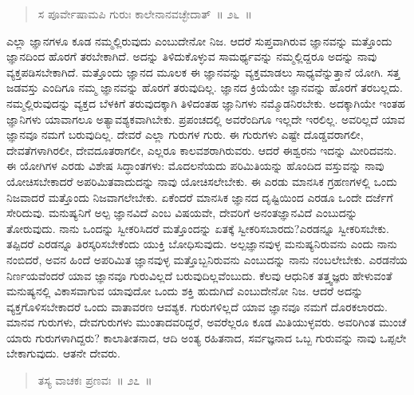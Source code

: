 \vspace{-0.2cm}

\begin{verse}
ಸ ಪೂರ್ವೇಷಾಮಪಿ ಗುರುಃ ಕಾಲೇನಾನವಚ್ಛೇದಾತ್​~॥ ೨೬~॥
\end{verse}

\vspace{-0.45cm}


\vspace{0.2cm}

ಎಲ್ಲಾ ಜ್ಞಾನಗಳೂ ಕೂಡ ನಮ್ಮಲ್ಲಿರುವುದು ಎಂಬುದೇನೋ ನಿಜ. ಆದರೆ ಸುಪ್ತವಾಗಿರುವ ಜ್ಞಾನವನ್ನು ಮತ್ತೊಂದು ಜ್ಞಾನದಿಂದ ಹೊರಗೆ ತರಬೇಕಾಗಿದೆ. ಅದನ್ನು ತಿಳಿದುಕೊಳ್ಳುವ ಸಾಮರ್ಥ್ಯವನ್ನು ನಮ್ಮಲ್ಲಿದ್ದರೂ ಅದನ್ನು ನಾವು ವ್ಯಕ್ತಪಡಿಸಬೇಕಾಗಿದೆ. ಮತ್ತೊಂದು ಜ್ಞಾನದ ಮೂಲಕ ಈ ಜ್ಞಾನವನ್ನು ವ್ಯಕ್ತಮಾಡಲು ಸಾಧ್ಯವೆನ್ನುತ್ತಾನೆ ಯೋಗಿ. ಸತ್ತ ಜಡವಸ್ತು ಎಂದಿಗೂ ನಮ್ಮ ಜ್ಞಾನವನ್ನು ಹೊರಗೆ ತರುವುದಿಲ್ಲ. ಜ್ಞಾನದ ಕ್ರಿಯೆಯೇ ಜ್ಞಾನವನ್ನು ಹೊರಗೆ ತರಬಲ್ಲದು. ನಮ್ಮಲ್ಲಿರುವುದನ್ನು ವ್ಯಕ್ತದ ಬೆಳಕಿಗೆ ತರುವುದಕ್ಕಾಗಿ ತಿಳಿದಂತಹ ಜ್ಞಾನಿಗಳು ನಮ್ಮೊಡನಿರಬೇಕು. ಅದಕ್ಕಾಗಿಯೇ ಇಂತಹ ಜ್ಞಾನಿಗಳು ಯಾವಾಗಲೂ ಅತ್ಯಾವಶ್ಯಕವಾಗಿಬೇಕು. ಪ್ರಪಂಚದಲ್ಲಿ ಅವರೆಂದಿಗೂ ಇಲ್ಲದೇ ಇರಲಿಲ್ಲ. ಅವರಿಲ್ಲದೆ ಯಾವ ಜ್ಞಾನವೂ ನಮಗೆ ಬರುವುದಿಲ್ಲ. ದೇವರೆ ಎಲ್ಲಾ ಗುರುಗಳ ಗುರು. ಈ ಗುರುಗಳು ಎಷ್ಟೇ ದೊಡ್ಡವರಾಗಲೀ, ದೇವತೆಗಳಾಗಿರಲೀ, ದೇವದೂತರಾಗಲೀ, ಎಲ್ಲರೂ ಕಾಲವಶರಾಗಿರುವರು. ಆದರೆ ಈಶ್ವರನು ಇದನ್ನು ಮೀರಿದವನು. ಈ ಯೋಗಿಗಳ ಎರಡು ವಿಶೇಷ ಸಿದ್ಧಾಂತಗಳು: ಮೊದಲನೆಯದು ಪರಿಮಿತಿಯನ್ನು ಹೊಂದಿದ ವಸ್ತುವನ್ನು ನಾವು ಯೋಚಿಸಬೇಕಾದರೆ ಅಪರಿಮಿತವಾದುದನ್ನು ನಾವು ಯೋಚಿಸಲೇಬೇಕು. ಈ ಎರಡು ಮಾನಸಿಕ ಗ್ರಹಣಗಳಲ್ಲಿ ಒಂದು ನಿಜವಾದರೆ ಮತ್ತೊಂದು ನಿಜವಾಗಲೇಬೇಕು. ಏಕೆಂದರೆ ಮಾನಸಿಕ ಜ್ಞಾನದ ದೃಷ್ಟಿಯಿಂದ ಎರಡೂ ಒಂದೇ ದರ್ಜೆಗೆ ಸೇರಿದುವು. ಮನುಷ್ಯನಿಗೆ ಅಲ್ಪ ಜ್ಞಾನವಿದೆ ಎಂಬ ವಿಷಯವೇ, ದೇವರಿಗೆ ಅನಂತಜ್ಞಾನವಿದೆ ಎಂಬುದನ್ನು ತೋರುವುದು. ನಾನು ಒಂದನ್ನು ಸ್ವೀಕರಿಸಿದರೆ ಮತ್ತೊಂದನ್ನು ಏತಕ್ಕೆ ಸ್ವೀಕರಿಸಬಾರದು?\break ಎರಡನ್ನೂ ಸ್ವೀಕರಿಸಬೇಕು. ತಪ್ಪಿದರೆ ಎರಡನ್ನೂ ತಿರಸ್ಕರಿಸಬೇಕೆಂದು ಯುಕ್ತಿ ಬೋಧಿಸುವುದು. ಅಲ್ಪಜ್ಞಾನವುಳ್ಳ ಮನುಷ್ಯನಿರುವನು ಎಂದು ನಾನು ನಂಬಿದರೆ, ಅವನ ಹಿಂದೆ ಅಪರಿಮಿತ ಜ್ಞಾನವುಳ್ಳ ಮತ್ತೊಬ್ಬನಿರುವನು ಎಂಬುದನ್ನು ನಾನು ನಂಬಲೇಬೇಕು. ಎರಡನೆಯ ನಿರ್ಣಯವೆಂದರೆ ಯಾವ ಜ್ಞಾನವೂ ಗುರುವಿಲ್ಲದೆ ಬರುವುದಿಲ್ಲವೆಂಬುದು. ಕೆಲವು ಆಧುನಿಕ ತತ್ತ್ವಜ್ಞರು ಹೇಳುವಂತೆ ಮನುಷ್ಯನಲ್ಲಿ ವಿಕಾಸವಾಗುವ ಯಾವುದೋ ಒಂದು ಶಕ್ತಿ ಹುದುಗಿದೆ ಎಂಬುದೇನೋ ನಿಜ. ಆದರೆ ಅದನ್ನು ವ್ಯಕ್ತಗೊಳಿಸಬೇಕಾದರೆ ಒಂದು ವಾತಾವರಣ ಆವಶ್ಯಕ. ಗುರುಗಳಿಲ್ಲದೆ ಯಾವ ಜ್ಞಾನವೂ ನಮಗೆ ದೊರಕಲಾರದು. ಮಾನವ ಗುರುಗಳು, ದೇವಗುರುಗಳು ಮುಂತಾದವರಿದ್ದರೆ, ಅವರೆಲ್ಲರೂ ಕೂಡ ಮಿತಿಯುಳ್ಳವರು. ಅವರಿಗಿಂತ ಮುಂಚೆ ಯಾರು ಗುರುಗಳಾಗಿದ್ದರು? ಕಾಲಾತೀತನಾದ, ಆದಿ ಅಂತ್ಯ ರಹಿತನಾದ, ಸರ್ವಜ್ಞನಾದ ಒಬ್ಬ ಗುರುವನ್ನು ನಾವು ಒಪ್ಪಲೇ ಬೇಕಾಗುವುದು. ಆತನೇ ದೇವರು. 

\vspace{-0.25cm}

\begin{verse}
ತಸ್ಯ ವಾಚಕಃ ಪ್ರಣವಃ~॥ ೨೭~॥
\end{verse}

